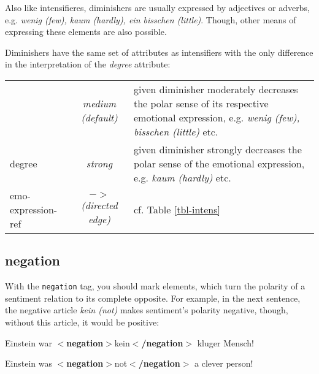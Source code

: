 \documentclass[11pt,a4paper]{article}
\newcommand{\xmltag}[1]{{\textbf{\small$<$#1$>$}}}
\newcommand{\negation}[1]{\xmltag{negation}#1\xmltag{/negation}}
\newlength\clmnwidth
\newenvironment{myexe}{
  \begin{exe}
    \ex\begin{center}
    \itshape
}{
    \end{center}
  \end{exe}
}
\begin{document}
Also like intensifieres, diminishers are usually expressed by adjectives or
adverbs, e.g. \textit{wenig (few), kaum (hardly), ein bisschen (little)}.
Though, other means of expressing these elements are also possible.

Diminishers have the same set of attributes as intensifiers with the only
difference in the interpretation of the \textit{degree} attribute:
\begin{center}
  \begin{tabular}{|l|c|p{\clmnwidth}|}\hline\label{tbl-dimin}

    & \textit{medium (default)} & given diminisher moderately
    decreases the polar sense of its respective emotional expression,
    e.g. \textit{wenig (few), bisschen (little)} etc.\\\cline{2-3}

    \multirow{-2}{*}{degree} & \textit{strong} & given diminisher
    strongly decreases the polar sense of the emotional expression,
    e.g. \textit{kaum (hardly)} etc.\\\hline

    emo-expression-ref & \textit{$->$\newline(directed edge)} &
    cf. Table \ref{tbl-intens}\\\hline
  \end{tabular}
\end{center}

\subsection{negation}
With the \texttt{negation} tag, you should mark elements, which turn the
polarity of a sentiment relation to its complete opposite.  For example, in
the next sentence, the negative article \textit{kein (not)} makes sentiment's
polarity negative, though, without this article, it would be positive:
\begin{myexe}
Einstein war \negation{kein} kluger Mensch!\label{ex:negation}

Einstein was \negation{not} a clever person!
\end{myexe}
\end{document}
